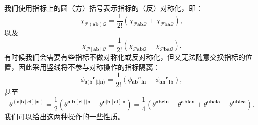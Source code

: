 我们使用指标上的圆（方）括号表示指标的（反）对称化，即：
\begin{equation*}
	\chi _{\mathcal{P} (\boldsymbol{ab} )\mathcal{Q}} =\frac{1}{2!} (\chi _{\mathcal{P}\boldsymbol{ab}\mathcal{Q}} +\chi _{\mathcal{P}\boldsymbol{ba}\mathcal{Q}} ),
\end{equation*}
以及
\begin{equation*}
	\chi _{\mathcal{P}[\boldsymbol{ab}]\mathcal{Q}} =\frac{1}{2!} (\chi _{\mathcal{P}\boldsymbol{ab}\mathcal{Q}} -\chi _{\mathcal{P}\boldsymbol{ba}\mathcal{Q}} ).
\end{equation*}
有时候我们会需要有些指标不做对称化或反对称化，但又无法随意交换指标的位置，因此采用竖线将不参与对称操作的指标隔离：
\begin{equation*}
	\phi {_{\boldsymbol{a} (\boldsymbol{b}}}^{\boldsymbol{c}}{}_{|\boldsymbol{l} |\boldsymbol{n} )} =\frac{1}{2!} (\phi {_{\boldsymbol{ab}}}^{\boldsymbol{c}}{}_{\boldsymbol{ln}} +\phi {_{\boldsymbol{an}}}^{\boldsymbol{c}}{}_{\boldsymbol{lb}} ),
\end{equation*}
甚至
\begin{equation*}
	\theta ^{(\boldsymbol{a}| \boldsymbol{b}[\boldsymbol{cl}]| \boldsymbol{n})} =\frac{1}{2} (\theta ^{\boldsymbol{a}| \boldsymbol{b}[\boldsymbol{cl}]| \boldsymbol{n}} +\theta ^{\boldsymbol{n}| \boldsymbol{b}[\boldsymbol{cl}]| \boldsymbol{a}} )=\frac{1}{4} (\theta ^{\boldsymbol{abcln}} -\theta ^{\boldsymbol{ablcn}} +\theta ^{\boldsymbol{nbcla}} -\theta ^{\boldsymbol{nblca}} ).
\end{equation*}
我们可以给出这两种操作的一些性质。



